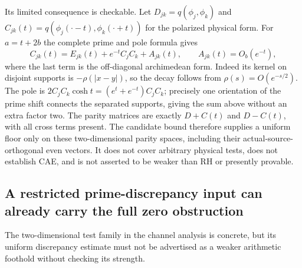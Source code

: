 \documentclass[11pt]{article}
\theoremstyle{remark}
\begin{document}
Its limited consequence is checkable. Let
$D_{jk}=q(\phi_j,\phi_k)$ and
$C_{jk}(t)=q(\phi_j(\cdot-t),\phi_k(\cdot+t))$ for the polarized
physical form. For $a=t+2b$ the complete prime and pole formula gives
\[
 C_{jk}(t)=E_{jk}(t)+e^{-t}C_jC_k+A_{jk}(t),
 \qquad A_{jk}(t)=O_b(e^{-t}),
\]
where the last term is the off-diagonal archimedean form. Indeed its
kernel on disjoint supports is $-\rho(|x-y|)$, so the decay follows
from $\rho(s)=O(e^{-s/2})$. The pole is
$2C_jC_k\cosh t=(e^t+e^{-t})C_jC_k$; precisely one orientation of
the prime shift connects the separated supports, giving the sum above
without an extra factor two. The parity matrices are exactly
$D+C(t)$ and $D-C(t)$, with all cross terms present. The candidate
bound therefore supplies a uniform floor only on these two-dimensional
parity spaces, including their actual-source-orthogonal even vectors.
It does not cover arbitrary physical tests, does not establish CAE,
and is not asserted to be weaker than RH or presently provable.


\subsection*{A restricted prime-discrepancy input can already carry the full zero obstruction}
\label{sec:ns43-bump-strength}
The two-dimensional test family in the channel analysis is concrete,
but its uniform discrepancy estimate must not be advertised as a
weaker arithmetic foothold without checking its strength.
\end{document}
